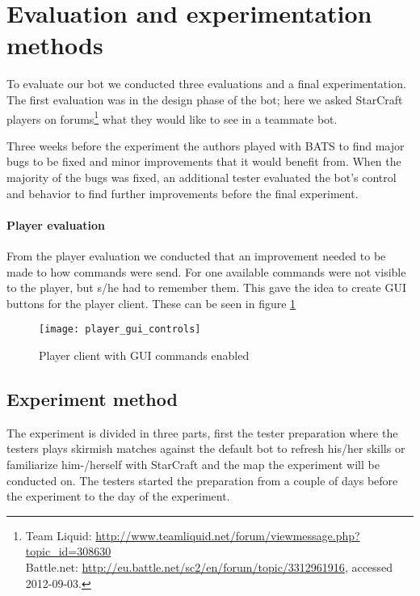 \section{Evaluation and experimentation methods}
To evaluate our bot we conducted three evaluations and a final experimentation. The first evaluation
was in the design phase of the bot; here we asked StarCraft players on forums\footnote{ Team Liquid:
\url{http://www.teamliquid.net/forum/viewmessage.php?topic\_id=308630}\\ Battle.net:
\url{http://eu.battle.net/sc2/en/forum/topic/3312961916}, accessed 2012-09-03.} what they would like
to see in a teammate bot.  

Three weeks before the experiment the authors played with BATS to find major bugs to be fixed and
minor improvements that it would benefit from. When the majority of the bugs was fixed, an additional
tester evaluated the bot’s control and behavior to find further improvements before the final experiment.

\paragraph{Player evaluation}
From the player evaluation we conducted that an improvement needed to be made to how commands were
send. For one available commands were not visible to the player, but s/he had to remember them.
This gave the idea to create GUI buttons for the player client. These can be seen in figure
\ref{fig:player_commands_gui}

\begin{figure}[htb]
\centering
\texttt{[image: player\_gui\_controls]}
\caption{Player client with GUI commands enabled}
\label{fig:player_commands_gui}
\end{figure}

\subsection{Experiment method}
The experiment is divided in three parts, first the tester preparation where the testers plays
skirmish matches against the default bot to refresh his/her skills or familiarize him-/herself with
StarCraft and the map the experiment will be conducted on. The testers started the preparation
from a couple of days before the experiment to the day of the experiment.

